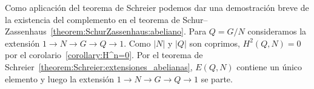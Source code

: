\begin{remark}
	Como aplicación del teorema de Schreier podemos dar una demostración breve
	de la existencia del complemento en el teorema de
	Schur--Zassenhaus~\ref{theorem:SchurZassenhaus:abeliano}.  Para $Q=G/N$
	consideramos la extensión $1\to N\to G\to Q\to 1$. Como $|N|$ y $|Q|$ son
	coprimos, $H^2(Q,N)=0$ por el corolario~\ref{corollary:H^n=0}.  Por el
	teorema de Schreier~\ref{theorem:Schreier:extensiones_abelianas}, $E(Q,N)$
	contiene un único elemento y luego la extensión $1\to N\to G\to Q\to 1$ se
	parte.
\end{remark}


%
%
%
%
%	
%
%
%
%
%
